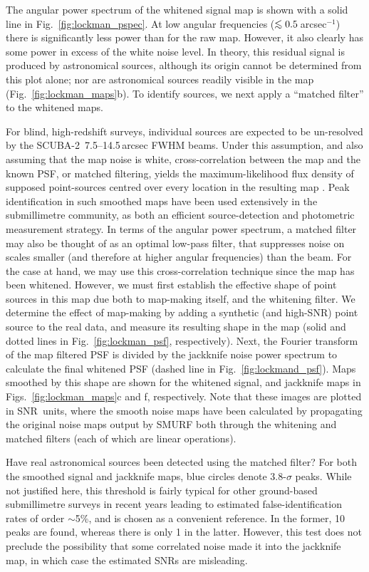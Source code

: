 \documentclass[useAMS,usenatbib,nofootinbib]{mn2e}
\newcommand{\snr}{SNR}
\newcommand{\scuba}{SCUBA-2}
\def\lsim{\mathrel{\lower2.5pt\vbox{\lineskip=0pt\baselineskip=0pt
          \hbox{$<$}\hbox{$\sim$}}}}
\begin{document}
The angular power spectrum of the whitened signal map is shown with a
solid line in Fig.~\ref{fig:lockman_pspec}. At low angular frequencies
($\lsim 0.5$\,arcsec$^{-1}$) there is significantly less power than
for the raw map. However, it also clearly has some power in excess of
the white noise level. In theory, this residual signal is produced by
astronomical sources, although its origin cannot be determined from
this plot alone; nor are astronomical sources readily visible in the
map (Fig.~\ref{fig:lockman_maps}b). To identify sources, we next apply
a ``matched filter'' to the whitened maps.

For blind, high-redshift surveys, individual sources are expected to
be un-resolved by the \scuba\ 7.5--14.5\,arcsec FWHM beams. Under this
assumption, and also assuming that the map noise is white,
cross-correlation between the map and the known PSF, or matched
filtering, yields the maximum-likelihood flux density of supposed
point-sources centred over every location in the resulting map
\citep[an extremely well-known result throughout astronomy,
see][]{stetson1987}. Peak identification in such smoothed maps have
been used extensively in the submillimetre community, as both an
efficient source-detection and photometric measurement strategy. In
terms of the angular power spectrum, a matched filter may also be
thought of as an optimal low-pass filter, that suppresses noise on
scales smaller (and therefore at higher angular frequencies) than the
beam. For the case at hand, we may use this cross-correlation
technique since the map has been whitened. However, we must first
establish the effective shape of point sources in this map due both to
map-making itself, and the whitening filter. We determine the effect
of map-making by adding a synthetic (and high-\snr) point source to
the real data, and measure its resulting shape in the map (solid and
dotted lines in Fig.~\ref{fig:lockman_psf}, respectively). Next, the
Fourier transform of the map filtered PSF is divided by the jackknife
noise power spectrum to calculate the final whitened PSF (dashed line
in Fig.~\ref{fig:lockmand_psf}). Maps smoothed by this shape are shown
for the whitened signal, and jackknife maps in
Figs.~\ref{fig:lockman_maps}c and f, respectively. Note that these
images are plotted in \snr\ units, where the smooth noise maps have
been calculated by propagating the original noise maps output by SMURF
both through the whitening and matched filters (each of which are
linear operations).

Have real astronomical sources been detected using the matched filter?
For both the smoothed signal and jackknife maps, blue circles denote
3.8-$\sigma$ peaks. While not justified here, this threshold is fairly
typical for other ground-based submillimetre surveys in recent years
\citep[e.g.,][]{coppin2006,perera2008,2009ApJ...707.1201W} leading to
estimated false-identification rates of order $\sim$5\%, and is chosen
as a convenient reference. In the former, 10 peaks are found, whereas
there is only 1 in the latter. However, this test does not preclude
the possibility that some correlated noise made it into the jackknife
map, in which case the estimated \snr s are misleading.
\end{document}
